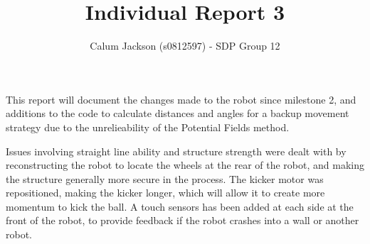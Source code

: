\documentclass[12pt]{article}
\begin{document}
\title{Individual Report 3}
\author{Calum Jackson (s0812597) - 
SDP Group 12}
\maketitle
\begin{flushleft}

This report will document the changes made to the robot since milestone 2, and additions to the code to calculate distances and angles for a backup movement strategy due to the unrelieability of the Potential Fields method. 

Issues involving straight line ability and structure strength were dealt with by reconstructing the robot to locate the wheels at the rear of the robot, and making the structure generally more secure in the process. The kicker motor was repositioned, making the kicker longer, which will allow it to create more momentum to kick the ball. A touch sensors has been added at each side at the front of the robot, to provide feedback if the robot crashes into a wall or another robot.





\end{flushleft}
\end{document}

